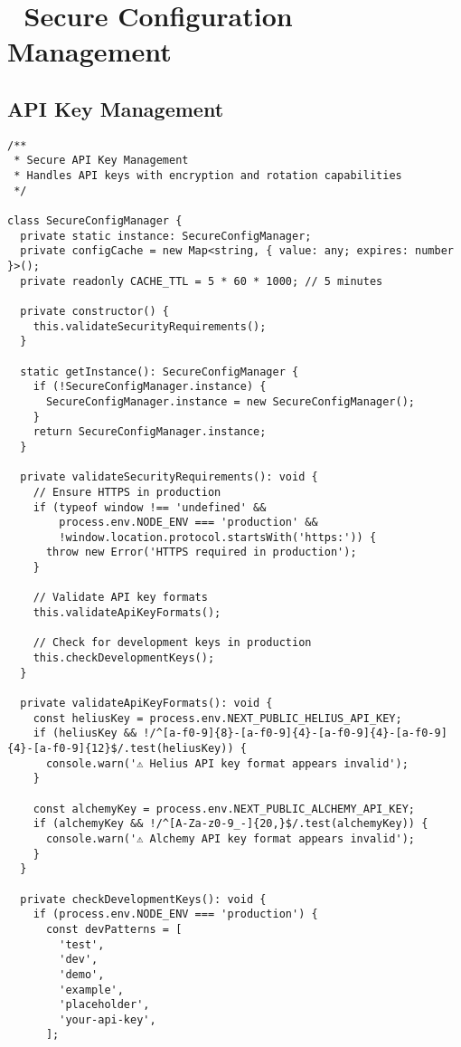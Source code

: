 \documentclass[11pt,a4paper]{article}
\begin{document}
\section{🔐 Secure Configuration Management}

\subsection{API Key Management}

\begin{lstlisting}[style=env, caption=API Key Security Best Practices]
/**
 * Secure API Key Management
 * Handles API keys with encryption and rotation capabilities
 */

class SecureConfigManager {
  private static instance: SecureConfigManager;
  private configCache = new Map<string, { value: any; expires: number }>();
  private readonly CACHE_TTL = 5 * 60 * 1000; // 5 minutes
  
  private constructor() {
    this.validateSecurityRequirements();
  }
  
  static getInstance(): SecureConfigManager {
    if (!SecureConfigManager.instance) {
      SecureConfigManager.instance = new SecureConfigManager();
    }
    return SecureConfigManager.instance;
  }
  
  private validateSecurityRequirements(): void {
    // Ensure HTTPS in production
    if (typeof window !== 'undefined' && 
        process.env.NODE_ENV === 'production' && 
        !window.location.protocol.startsWith('https:')) {
      throw new Error('HTTPS required in production');
    }
    
    // Validate API key formats
    this.validateApiKeyFormats();
    
    // Check for development keys in production
    this.checkDevelopmentKeys();
  }
  
  private validateApiKeyFormats(): void {
    const heliusKey = process.env.NEXT_PUBLIC_HELIUS_API_KEY;
    if (heliusKey && !/^[a-f0-9]{8}-[a-f0-9]{4}-[a-f0-9]{4}-[a-f0-9]{4}-[a-f0-9]{12}$/.test(heliusKey)) {
      console.warn('⚠️ Helius API key format appears invalid');
    }
    
    const alchemyKey = process.env.NEXT_PUBLIC_ALCHEMY_API_KEY;
    if (alchemyKey && !/^[A-Za-z0-9_-]{20,}$/.test(alchemyKey)) {
      console.warn('⚠️ Alchemy API key format appears invalid');
    }
  }
  
  private checkDevelopmentKeys(): void {
    if (process.env.NODE_ENV === 'production') {
      const devPatterns = [
        'test',
        'dev',
        'demo',
        'example',
        'placeholder',
        'your-api-key',
      ];
      

\end{lstlisting}
\end{document}
